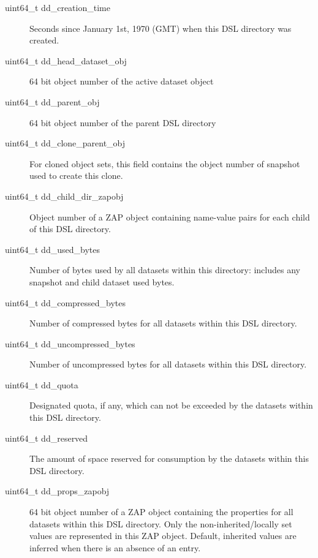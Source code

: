 \begin{description}
\item[uint64\_t dd\_creation\_time]
  Seconds since January 1st, 1970 (GMT) when this DSL directory was created.

\item[uint64\_t dd\_head\_dataset\_obj]
  64 bit object number of the active dataset object

\item[uint64\_t dd\_parent\_obj]
  64 bit object number of the parent DSL directory

\item[uint64\_t dd\_clone\_parent\_obj]
  For cloned object sets, this field contains the object number of snapshot used to create this clone.

\item[uint64\_t dd\_child\_dir\_zapobj]
  Object number of a ZAP object containing name-value pairs for each child of this DSL directory.

\item[uint64\_t dd\_used\_bytes]
  Number of bytes used by all datasets within this directory:
  includes any snapshot and child dataset used bytes.

\item[uint64\_t dd\_compressed\_bytes]
  Number of compressed bytes for all datasets within this DSL directory.

\item[uint64\_t dd\_uncompressed\_bytes]
  Number of uncompressed bytes for all datasets within this DSL directory.

\item[uint64\_t dd\_quota]
  Designated quota, if any, which can not be exceeded by the datasets within this DSL directory.

\item[uint64\_t dd\_reserved]
  The amount of space reserved for consumption by the datasets within this DSL directory.

\item[uint64\_t dd\_props\_zapobj]
  64 bit object number of a ZAP object containing the properties
  for all datasets within this DSL directory.
  Only the non-inherited/locally set values are represented in this ZAP object.
  Default, inherited values are inferred when there is an absence of an entry.
\end{description}

